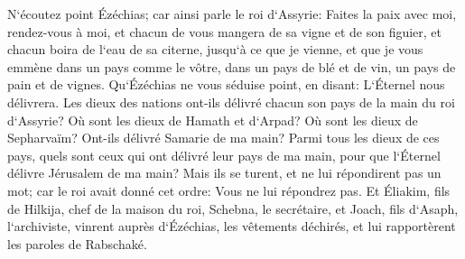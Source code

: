 \verse N`écoutez point Ézéchias; car ainsi parle le roi d`Assyrie: Faites la paix avec moi, rendez-vous à moi, et chacun de vous mangera de sa vigne et de son figuier, et chacun boira de l`eau de sa citerne, 
\verse jusqu`à ce que je vienne, et que je vous emmène dans un pays comme le vôtre, dans un pays de blé et de vin, un pays de pain et de vignes. 
\verse Qu`Ézéchias ne vous séduise point, en disant: L`Éternel nous délivrera. Les dieux des nations ont-ils délivré chacun son pays de la main du roi d`Assyrie? 
\verse Où sont les dieux de Hamath et d`Arpad? Où sont les dieux de Sepharvaïm? Ont-ils délivré Samarie de ma main? 
\verse Parmi tous les dieux de ces pays, quels sont ceux qui ont délivré leur pays de ma main, pour que l`Éternel délivre Jérusalem de ma main? 
\verse Mais ils se turent, et ne lui répondirent pas un mot; car le roi avait donné cet ordre: Vous ne lui répondrez pas. 
\verse Et Éliakim, fils de Hilkija, chef de la maison du roi, Schebna, le secrétaire, et Joach, fils d`Asaph, l`archiviste, vinrent auprès d`Ézéchias, les vêtements déchirés, et lui rapportèrent les paroles de Rabschaké. 


